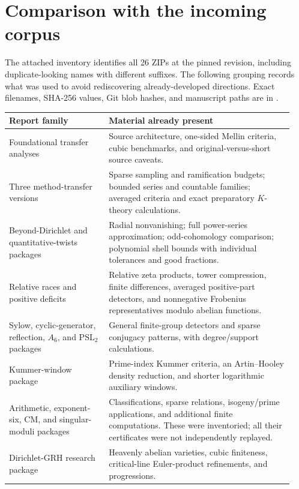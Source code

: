 \section{Comparison with the incoming corpus}
\label{sec:corpus}

The attached inventory identifies all 26 ZIPs at the pinned revision,
including duplicate-looking names with different suffixes. The following
grouping records what was used to avoid rediscovering already-developed
directions. Exact filenames, SHA-256 values, Git blob hashes, and manuscript
paths are in .

\begin{longtable}{@{}p{0.33\linewidth}p{0.61\linewidth}@{}}
\toprule
Report family & Material already present\\
\midrule
\endhead
Foundational transfer analyses & Source architecture, one-sided Mellin
criteria, cubic benchmarks, and original-versus-short source caveats.\\
Three method-transfer versions & Sparse sampling and ramification budgets;
bounded series and countable families; averaged criteria and exact
preparatory \(K\)-theory calculations.\\
Beyond-Dirichlet and quantitative-twists packages & Radial nonvanishing;
full power-series approximation; odd-cohomology comparison; polynomial
shell bounds with individual tolerances and good fractions.\\
Relative races and positive deficits & Relative zeta products, tower
compression, finite differences, averaged positive-part detectors, and
nonnegative Frobenius representatives modulo abelian functions.\\
Sylow, cyclic-generator, reflection, \(A_6\), and
\(\mathrm{PSL}_2\) packages & General finite-group detectors and sparse
conjugacy patterns, with degree/support calculations.\\
Kummer-window package & Prime-index Kummer criteria, an Artin--Hooley
density reduction, and shorter logarithmic auxiliary windows.\\
Arithmetic, exponent-six, CM, and singular-moduli packages &
Classifications, sparse relations, isogeny/prime applications, and
additional finite computations. These were inventoried; all their
certificates were not independently replayed.\\
Dirichlet-GRH research package & Heavenly abelian varieties, cubic
finiteness, critical-line Euler-product refinements, and progressions.\\
\bottomrule
\end{longtable}

